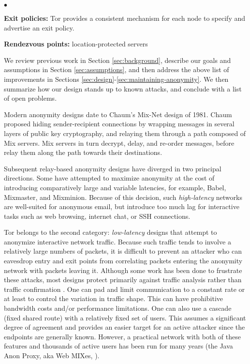 \documentclass[times,10pt,twocolumn]{article}
\newenvironment{tightlist}{\begin{list}{$\bullet$}{
  \setlength{\itemsep}{0mm}
    \setlength{\parsep}{0mm}
    }}{\end{list}}
\begin{document}
\begin{tightlist}
\item \textbf{Exit policies:}
Tor provides a consistent mechanism for each node to specify and
advertise an exit policy.

\item \textbf{Rendezvous points:}
location-protected servers

\end{tightlist}

We review previous work in Section \ref{sec:background}, describe
our goals and assumptions in Section \ref{sec:assumptions},
and then address the above list of improvements in Sections
\ref{sec:design}-\ref{sec:maintaining-anonymity}. We then summarize
how our design stands up to known attacks, and conclude with a list of
open problems.


\label{sec:background}

\label{sec:related-work}
Modern anonymity designs date to Chaum's Mix-Net\cite{chaum-mix} design of
1981.  Chaum proposed hiding sender-recipient connections by wrapping
messages in several layers of public key cryptography, and relaying them
through a path composed of Mix servers.  Mix servers in turn decrypt, delay,
and re-order messages, before relay them along the path towards their
destinations.

Subsequent relay-based anonymity designs have diverged in two
principal directions.  Some have attempted to maximize anonymity at
the cost of introducing comparatively large and variable latencies,
for example, Babel\cite{babel}, Mixmaster\cite{mixmaster-spec}, and
Mixminion\cite{minion-design}.  Because of this
decision, such \emph{high-latency} networks are well-suited for anonymous
email, but introduce too much lag for interactive tasks such as web browsing,
internet chat, or SSH connections.

Tor belongs to the second category: \emph{low-latency} designs that
attempt to anonymize interactive network traffic.  Because such
traffic tends to involve a relatively large numbers of packets, it is
difficult to prevent an attacker who can eavesdrop entry and exit
points from correlating packets entering the anonymity network with
packets leaving it. Although some work has been done to frustrate
these attacks, most designs protect primarily against traffic analysis
rather than traffic confirmation \cite{or-jsac98}.  One can pad and
limit communication to a constant rate or at least to control the
variation in traffic shape. This can have prohibitive bandwidth costs
and/or performance limitations. One can also use a cascade (fixed
shared route) with a relatively fixed set of users. This assumes a
significant degree of agreement and provides an easier target for an active
attacker since the endpoints are generally known. However, a practical
network with both of these features and thousands of active users has
been run for many years (the Java Anon Proxy, aka Web MIXes,
\cite{web-mix}).
\end{document}
